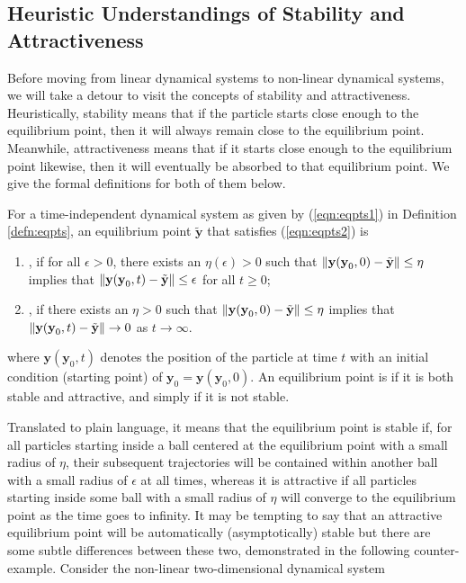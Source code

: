 \subsection{Heuristic Understandings of Stability and Attractiveness}
Before moving from linear dynamical systems to non-linear dynamical systems, we will take a detour to visit the concepts of stability and attractiveness. Heuristically, stability means that if the particle starts close enough to the equilibrium point, then it will always remain close to the equilibrium point. Meanwhile, attractiveness means that if it starts close enough to the equilibrium point likewise, then it will eventually be absorbed to that equilibrium point. We give the formal definitions for both of them below.
\begin{defn}
For a time-independent dynamical system as given by (\ref{eqn:eqpts1}) in Definition \ref{defn:eqpts}, an equilibrium point $\tilde{\textbf{y}}$ that satisfies (\ref{eqn:eqpts2}) is
\begin{enumerate}[label=(\alph*)]
    \item {}, if for all $\epsilon > 0$, there exists an $\eta(\epsilon) > 0$\footnotemark{} such that $\norm{\textbf{y}(\textbf{y}_0, 0) - \tilde{\textbf{y}}} \leq \eta$ implies that $\norm{\textbf{y}(\textbf{y}_0, t) - \tilde{\textbf{y}}} \leq \epsilon$ for all $t \geq 0$;
    \item {}, if there exists an $\eta > 0$ such that $\norm{\textbf{y}(\textbf{y}_0, 0) - \tilde{\textbf{y}}} \leq \eta$ implies that $\norm{\textbf{y}(\textbf{y}_0, t) - \tilde{\textbf{y}}} \to 0$ as $t \to \infty$.
\end{enumerate}
where $\textbf{y}(\textbf{y}_0, t)$ denotes the position of the particle at time $t$ with an initial condition (starting point) of $\textbf{y}_0 = \textbf{y}(\textbf{y}_0, 0)$. An equilibrium point is  if it is both stable and attractive, and simply  if it is not stable.
\end{defn}
 Translated to plain language, it means that the equilibrium point is stable if, for all particles starting inside a ball centered at the equilibrium point with a small radius of $\eta$, their subsequent trajectories will be contained within another ball with a small radius of $\epsilon$ at all times, whereas it is attractive if all particles starting inside some ball with a small radius of $\eta$ will converge to the equilibrium point as the time goes to infinity. It may be tempting to say that an attractive equilibrium point will be automatically (asymptotically) stable but there are some subtle differences between these two, demonstrated in the following counter-example. Consider the non-linear two-dimensional dynamical system

